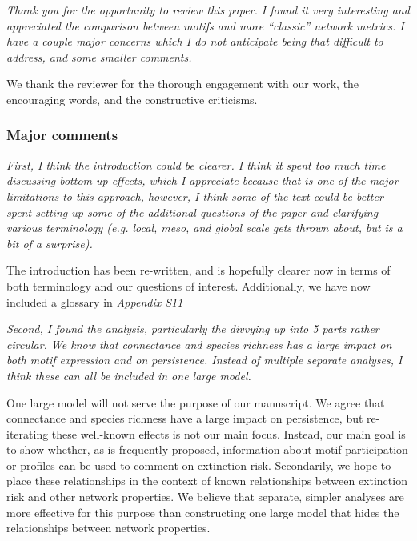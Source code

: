 \documentclass[12pt]{article}
\newcommand{\us}{\rm \setlength{\leftskip}{0.3cm} \setlength{\rightskip}{0.3cm}}
\newcommand{\them}{\it \setlength{\leftskip}{0cm} \setlength{\rightskip}{0cm}}
\begin{document}
    \them
    Thank you for the opportunity to review this paper. I found it very interesting and appreciated the comparison between motifs and more “classic” network metrics. I have a couple major concerns which I do not anticipate being that difficult to address, and some smaller comments.
    
    \us
    We thank the reviewer for the thorough engagement with our work, the encouraging words, and the constructive criticisms. 

    \subsubsection*{Major comments}
    
        \them
        First, I think the introduction could be clearer. I think it spent too much time discussing bottom up effects, which I appreciate because that is one of the major limitations to this approach, however, I think some of the text could be better spent setting up some of the additional questions of the paper and clarifying various terminology (e.g. local, meso, and global scale gets thrown about, but is a bit of a surprise).
        
        \us
        The introduction has been re-written, and is hopefully clearer now in terms of both terminology and our questions of interest. Additionally, we have now included a glossary in \emph{Appendix S11}
        
        \them
        Second, I found the analysis, particularly the divvying up into 5 parts rather circular. We know that connectance and species richness has a large impact on both motif expression and on persistence. Instead of multiple separate analyses, I think these can all be included in one large model. 
        
        \us One large model will not serve the purpose of our manuscript. We agree that connectance and species richness have a large impact on persistence, but re-iterating these well-known effects is not our main focus. Instead, our main goal is to show whether, as is frequently proposed, information about motif participation or profiles can be used to comment on extinction risk. Secondarily, we hope to place these relationships in the context of known relationships between extinction risk and other network properties. We believe that separate, simpler analyses are more effective for this purpose than constructing one large model that hides the relationships between network properties.
        
\end{document}

